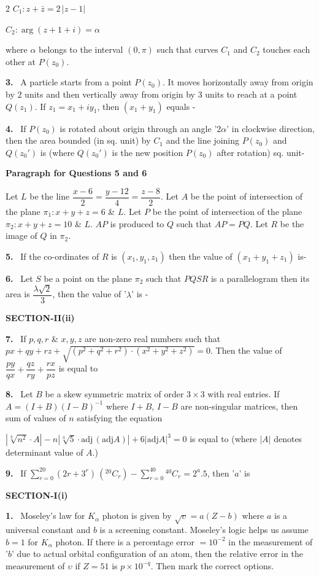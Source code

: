 \documentclass[10pt]{extarticle}
\newcommand{\papersec}[1]{\par\bigskip{\centering\Large\bfseries PAPER-#1\par}\medskip}
\newcommand{\partsec}[2]{\par\medskip\noindent{\large\bfseries PART-#1: #2}\par\smallskip}
\newcommand{\sect}[1]{\par\smallskip\noindent\textbf{#1}\par}
\newcommand{\qn}[1]{\par\smallskip\noindent\textbf{#1.}~}
\newcommand{\paraq}[2]{\par\smallskip\noindent\textbf{Paragraph for Questions #1 and #2}\par}
\newenvironment{qoptions}{\begin{itemize}[leftmargin=1.8em,itemsep=1pt,topsep=2pt,label={}]}{\end{itemize}}
\begin{document}
\begin{multicols}{2}
$C_1:z+\bar z=2\,|z-1|$\par
$C_2:\arg(z+1+i)=\alpha$\par
where $\alpha$ belongs to the interval $(0,\pi)$ such that curves $C_1$ and $C_2$ touches each other at $P(z_0)$.
\qn{3} A particle starts from a point $P(z_0)$. It moves horizontally away from origin by $2$ units and then vertically away from origin by $3$ units to reach at a point $Q(z_1)$. If $z_1=x_1+iy_1$, then $(x_1+y_1)$ equals -
\qn{4} If $P(z_0)$ is rotated about origin through an angle '$2\alpha$' in clockwise direction, then the area bounded (in sq. unit) by $C_1$ and the line joining $P(z_0)$ and $Q(z_0')$ is (where $Q(z_0')$ is the new position $P(z_0)$ after rotation) sq. unit-
\paraq{5}{6}
Let $L$ be the line $\dfrac{x-6}{2}=\dfrac{y-12}{4}=\dfrac{z-8}{2}$. Let $A$ be the point of intersection of the plane $\pi_1:x+y+z=6$ \& $L$. Let $P$ be the point of intersection of the plane $\pi_2:x+y+z=10$ \& $L$. $AP$ is produced to $Q$ such that $AP=PQ$. Let $R$ be the image of $Q$ in $\pi_2$.
\qn{5} If the co-ordinates of $R$ is $(x_1,y_1,z_1)$ then the value of $(x_1+y_1+z_1)$ is-
\qn{6} Let $S$ be a point on the plane $\pi_2$ such that $PQSR$ is a parallelogram then its area is $\dfrac{\lambda\sqrt2}{3}$, then the value of '$\lambda$' is -
\sect{SECTION-II(ii)}
\qn{7} If $p,q,r$ \& $x,y,z$ are non-zero real numbers such that $px+qy+rz+\sqrt{(p^2+q^2+r^2)\cdot(x^2+y^2+z^2)}=0$. Then the value of $\dfrac{py}{qx}+\dfrac{qz}{ry}+\dfrac{rx}{pz}$ is equal to
\qn{8} Let $B$ be a skew symmetric matrix of order $3\times3$ with real entries. If $A=(I+B)(I-B)^{-1}$ where $I+B$, $I-B$ are non-singular matrices, then sum of values of $n$ satisfying the equation\par
{\small$\left|\sqrt[3]{n^2}\cdot A\right|-n\left|\sqrt[3]{5}\cdot\mathrm{adj}\,(\mathrm{adj}A)\right|+6|\mathrm{adj}A|^3=0$} is equal to (where $|A|$ denotes determinant value of $A$.)
\qn{9} If $\displaystyle\sum_{r=0}^{20}(2r+3^r)\,\left({}^{20}C_r\right)-\sum_{r=0}^{40}{}^{40}C_r=2^a.5$, then '$a$' is
\papersec{2}
\partsec{1}{PHYSICS}
\sect{SECTION-I(i)}
\qn{1} Moseley's law for $K_\alpha$ photon is given by $\sqrt\upsilon=a(Z-b)$ where $a$ is a universal constant and $b$ is a screening constant. Moseley's logic helps us assume $b=1$ for $K_\alpha$ photon. If there is a percentage error $=10^{-2}$ in the measurement of '$b$' due to actual orbital configuration of an atom, then the relative error in the measurement of $\upsilon$ if $Z=51$ is $p\times10^{-q}$. Then mark the correct options.
\begin{qoptions}

\end{qoptions}
\end{multicols}
\end{document}
